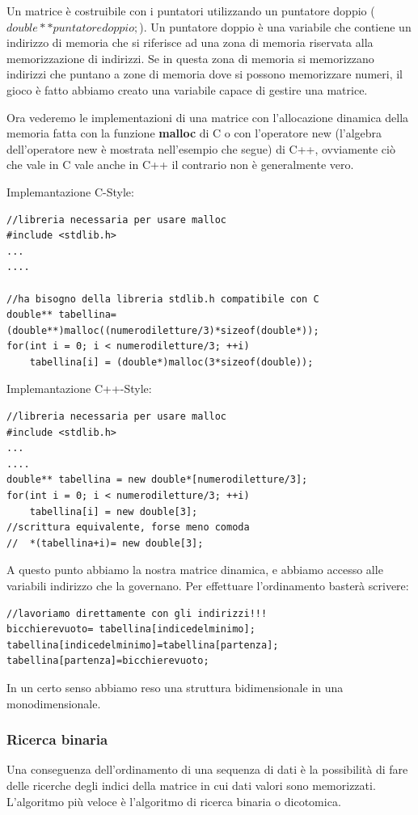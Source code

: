 \documentclass[11pt,fleqn]{book} %
\begin{document}
Un matrice è costruibile con i puntatori utilizzando un puntatore doppio ($double **puntatoredoppio;$).
Un puntatore doppio è una variabile che contiene un indirizzo di memoria che si riferisce ad una zona di memoria riservata alla memorizzazione di indirizzi. Se in questa zona di memoria si memorizzano indirizzi che puntano a zone di memoria dove si possono memorizzare numeri, il gioco è fatto abbiamo creato una variabile capace di gestire una matrice.

Ora vederemo le implementazioni di una matrice con l'allocazione dinamica della memoria fatta con la funzione \textbf{malloc} di C o con l'operatore new (l'algebra dell'operatore new è mostrata nell'esempio che segue) di C++, ovviamente ciò che vale in C vale anche in C++ il contrario non è generalmente vero.

Implemantazione C-Style:
\begin{verbatim}
//libreria necessaria per usare malloc
#include <stdlib.h>
...
....

//ha bisogno della libreria stdlib.h compatibile con C
double** tabellina=  (double**)malloc((numerodiletture/3)*sizeof(double*));
for(int i = 0; i < numerodiletture/3; ++i)
    tabellina[i] = (double*)malloc(3*sizeof(double));

\end{verbatim}

Implemantazione C++-Style:

\begin{verbatim}
//libreria necessaria per usare malloc
#include <stdlib.h>
...
....
double** tabellina = new double*[numerodiletture/3];
for(int i = 0; i < numerodiletture/3; ++i)
    tabellina[i] = new double[3];
//scrittura equivalente, forse meno comoda
//  *(tabellina+i)= new double[3];
\end{verbatim}


A questo punto abbiamo la nostra matrice dinamica, e abbiamo accesso alle variabili indirizzo che la governano. Per effettuare l'ordinamento basterà scrivere:

\begin{verbatim}
//lavoriamo direttamente con gli indirizzi!!!
bicchierevuoto= tabellina[indicedelminimo];
tabellina[indicedelminimo]=tabellina[partenza];
tabellina[partenza]=bicchierevuoto;
\end{verbatim}

In un certo senso abbiamo reso una struttura bidimensionale in una monodimensionale.

\subsubsection{Ricerca binaria}
Una conseguenza dell'ordinamento di una sequenza di dati è la possibilità di fare delle ricerche degli indici della matrice in cui dati valori sono memorizzati. L'algoritmo più veloce è l'algoritmo di ricerca binaria o dicotomica.
\end{document}
